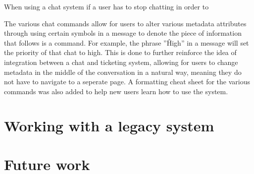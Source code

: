 \documentclass{l4proj}
\begin{document}
When using a chat system if a user has to stop chatting in order to

The various chat commands allow for users to alter various metadata attributes through using certain symbols in a message to denote the piece of information that follows is a command.  For example, the phrase ''\^High'' in a message will set the priority of that chat to high.  This is done to further reinforce the idea of integration between a chat and ticketing system, allowing for users to change metadata in the middle of the conversation in a natural way, meaning they do not have to navigate to a seperate page.  A formatting cheat sheet for the various commands was also added to help new users learn how to use the system.


\chapter{Working with a legacy system}
\chapter{Future work}




\begin{appendices}


\end{appendices}




\end{document}
